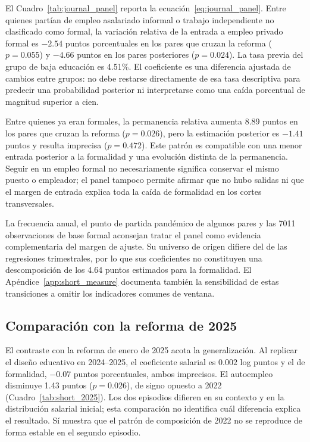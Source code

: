 El Cuadro~\ref{tab:journal_panel} reporta la ecuación~\eqref{eq:journal_panel}. Entre quienes partían de empleo asalariado informal o trabajo independiente no clasificado como formal, la variación relativa de la entrada a empleo privado formal es $-2.54$ puntos porcentuales en los pares que cruzan la reforma ($p=0.055$) y $-4.66$ puntos en los pares posteriores ($p=0.024$). La tasa previa del grupo de baja educación es 4.51\%. El coeficiente es una diferencia ajustada de cambios entre grupos: no debe restarse directamente de esa tasa descriptiva para predecir una probabilidad posterior ni interpretarse como una caída porcentual de magnitud superior a cien.

Entre quienes ya eran formales, la permanencia relativa aumenta 8.89 puntos en los pares que cruzan la reforma ($p=0.026$), pero la estimación posterior es $-1.41$ puntos y resulta imprecisa ($p=0.472$). Este patrón es compatible con una menor entrada posterior a la formalidad y una evolución distinta de la permanencia. Seguir en un empleo formal no necesariamente significa conservar el mismo puesto o empleador; el panel tampoco permite afirmar que no hubo salidas ni que el margen de entrada explica toda la caída de formalidad en los cortes transversales.



La frecuencia anual, el punto de partida pandémico de algunos pares y las 7011 observaciones de base formal aconsejan tratar el panel como evidencia complementaria del margen de ajuste. Su universo de origen difiere del de las regresiones trimestrales, por lo que sus coeficientes no constituyen una descomposición de los 4.64 puntos estimados para la formalidad. El Apéndice~\ref{app:short_measure} documenta también la sensibilidad de estas transiciones a omitir los indicadores comunes de ventana.

\subsection{Comparación con la reforma de 2025}

El contraste con la reforma de enero de 2025 acota la generalización. Al replicar el diseño educativo en 2024--2025, el coeficiente salarial es $0.002$ log puntos y el de formalidad, $-0.07$ puntos porcentuales, ambos imprecisos. El autoempleo disminuye 1.43 puntos ($p=0.026$), de signo opuesto a 2022 (Cuadro~\ref{tab:short_2025}). Los dos episodios difieren en su contexto y en la distribución salarial inicial; esta comparación no identifica cuál diferencia explica el resultado. Sí muestra que el patrón de composición de 2022 no se reproduce de forma estable en el segundo episodio.
\FloatBarrier

